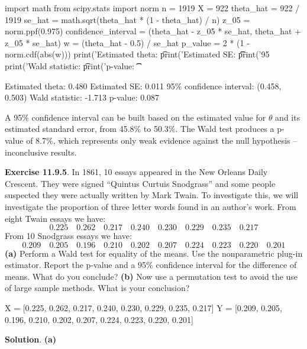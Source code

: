 \begin{python}
import math
from scipy.stats import norm
n = 1919
X = 922
theta_hat = 922 / 1919
se_hat = math.sqrt(theta_hat * (1 - theta_hat) / n)
z_05 = norm.ppf(0.975)
confidence_interval = (theta_hat - z_05 * se_hat, theta_hat + z_05 * se_hat)
w = (theta_hat - 0.5) / se_hat
p_value = 2 * (1 - norm.cdf(abs(w)))
print('Estimated theta: \t %
print('Estimated SE: \t\t %
print('95%
print('Wald statistic: \t %
print('p-value: \t\t %
\end{python}
\begin{console}
Estimated theta:         0.480
Estimated SE:            0.011
95\% confidence interval: (0.458, 0.503)
Wald statistic:          -1.713
p-value:                 0.087
\end{console}
A 95\% confidence interval can be built based on the estimated value for
\(\theta\) and its estimated standard error, from 45.8\% to 50.3\%.
The Wald test produces a p-value of 8.7\%, which represents only weak
evidence against the null hypothesis -- inconclusive results.

\textbf{Exercise 11.9.5}. In 1861, 10 essays appeared in the New Orleans
Daily Crescent. They were signed ``Quintus Curtuis Snodgrass'' and some
people suspected they were actually written by Mark Twain. To
investigate this, we will investigate the proportion of three letter
words found in an author's work.
From eight Twain essays we have:
\[
0.225 \quad 0.262 \quad 0.217 \quad 0.240 \quad 0.230 \quad 0.229 \quad 0.235 \quad 0.217
\]
From 10 Snodgrass essays we have:
\[
0.209 \quad 0.205 \quad 0.196 \quad 0.210 \quad 0.202 \quad 0.207 \quad 0.224 \quad 0.223 \quad 0.220 \quad 0.201
\]
\textbf{(a)} Perform a Wald test for equality of the means. Use the
nonparametric plug-in estimator. Report the p-value and a 95\%
confidence interval for the difference of means. What do you conclude?
\textbf{(b)} Now use a permutation test to avoid the use of large sample
methods. What is your conclusion?

\begin{python}
X = [0.225, 0.262, 0.217, 0.240, 0.230, 0.229, 0.235, 0.217]
Y = [0.209, 0.205, 0.196, 0.210, 0.202, 0.207, 0.224, 0.223, 0.220, 0.201]
\end{python}

\textbf{Solution}.
\textbf{(a)}

